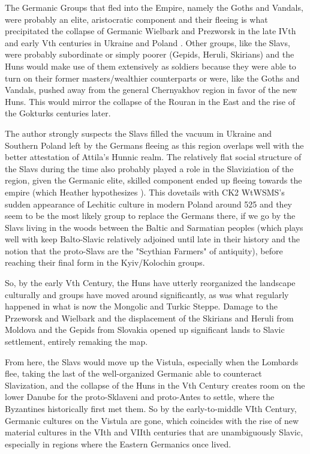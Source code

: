 \documentclass{article}
\begin{document}
	The Germanic Groups that fled into the Empire, namely the Goths and Vandals, were probably an elite, aristocratic component and their fleeing is what precipitated the collapse of Germanic Wielbark and Prezworsk in the late IVth and early Vth centuries in Ukraine and Poland \cite{HeatherEmpiresAndBarbarians}.
	Other groups, like the Slavs, were probably subordinate or simply poorer (Gepids, Heruli, Skirians) and the Huns would make use of them extensively as soldiers because they were able to turn on their former masters/wealthier counterparts or were, like the Goths and Vandals, pushed away from the general Chernyakhov region in favor of the new Huns.
	This would mirror the collapse of the Rouran in the East and the rise of the Gokturks centuries later.
	
	The author strongly suspects the Slavs filled the vacuum in Ukraine and Southern Poland left by the Germans fleeing as this region overlaps well with the better attestation of Attila’s Hunnic realm.
	The relatively flat social structure of the Slavs during the time also probably played a role in the Slaviziation of the region, given the Germanic elite, skilled component ended up fleeing towards the empire (which Heather hypothesizes \cite{HeatherEmpiresAndBarbarians}).
	This dovetails with CK2 WtWSMS’s sudden appearance of Lechitic culture in modern Poland around 525 and they seem to be the most likely group to replace the Germans there, if we go by the Slavs living in the woods between the Baltic and Sarmatian peoples (which plays well with keep Balto-Slavic relatively adjoined until late in their history and the notion that the proto-Slavs are the "Scythian Farmers" of antiquity), before reaching their final form in the Kyiv/Kolochin groups.
	
	So, by the early Vth Century, the Huns have utterly reorganized the landscape culturally and groups have moved around significantly, as was what regularly happened in what is now the Mongolic and Turkic Steppe.
	Damage to the Przeworsk and Wielbark and the displacement of the Skirians and Heruli from Moldova and the Gepids from Slovakia opened up significant lands to Slavic settlement, entirely remaking the map.
	
	From here, the Slavs would move up the Vistula, especially when the Lombards flee, taking the last of the well-organized Germanic able to counteract Slavization, and the collapse of the Huns in the Vth Century creates room on the lower Danube for the proto-Sklaveni and proto-Antes to settle, where the Byzantines historically first met them.
	So by the early-to-middle VIth Century, Germanic cultures on the Vistula are gone, which coincides with the rise of new material cultures in the VIth and VIIth centuries that are unambiguously Slavic, especially in regions where the Eastern Germanics once lived.
	
\end{document}
